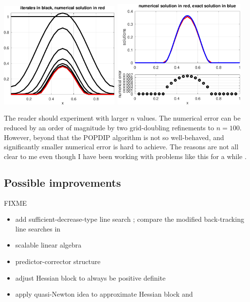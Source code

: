 \documentclass[11pt]{article}
\begin{document}
\medskip
\noindent \mbox{\includegraphics[width=0.45\textwidth]{figs/iteratesobstacle.pdf} \qquad
\includegraphics[width=0.5\textwidth]{figs/errorobstacle.pdf}}

The reader should experiment with larger $n$ values.  The numerical error can be reduced by an order of magnitude by two grid-doubling refinements to $n=100$.  However, beyond that the POPDIP algorithm is not so well-behaved, and significantly smaller numerical error is hard to achieve.  The reasons are not all clear to me even though I have been working with problems like this for a while \cite{Bueler2016}.




\subsection*{Possible improvements}

FIXME
\begin{itemize}
\item add sufficient-decrease-type line search \cite[sections 19.3, 19.4]{NocedalWright2006}; compare the modified back-tracking line searches in \cite{BensonMunson2006}
\item scalable linear algebra
\item predictor-corrector structure \cite[section 14.2]{NocedalWright2006}
\item adjust Hessian block to always be positive definite \cite[section 11.4]{GrivaNashSofer2009}
\item apply quasi-Newton idea to approximate Hessian block \cite[sections 12.3, 13.5]{GrivaNashSofer2009} and \cite[section 19.3]{NocedalWright2006}
\end{itemize}
\end{document}
